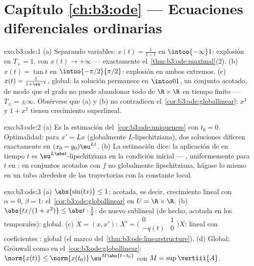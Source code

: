 \section*{Capítulo \ref{ch:b3:ode} --- Ecuaciones diferenciales
ordinarias}

\begin{solution}{exo:b3:ode:1}
(a) Separando variables: $x(t) = \frac1{1 - t}$ en $\intoo{-\infty}1$:
explosión en $T_+ = 1$, con $x(t) \to
+\infty$ --- exactamente el~\cref{thm:b3:ode:maximal}(2). (b)
$x(t) = \tan t$ en $\intoo{-\pi/2}{\pi/2}$: explosión en ambos extremos.
(c) $x(t) = \frac{1}{1 + \eu^{-t}}$, global: la solución permanece en
$\intoo01$, un conjunto acotado, de modo que el grafo no puede abandonar
todo  de $\R\times\R$ en
tiempo finito --- $T_\pm
= \pm\infty$. Obsérvese que (a) y (b) no contradicen
el~\cref{cor:b3:ode:globallinear}: $x^2$ y $1 + x^2$ tienen crecimiento
superlineal.
\end{solution}

\begin{solution}{exo:b3:ode:2}
(a) Es la estimación del~\cref{cor:b3:ode:uniqueness} con $t_0
= 0$. Optimalidad: para $x' = Lx$ (globalmente $L$-lipschitziana), dos
soluciones difieren exactamente en $(x_0 - y_0)\eu^{Lt}$. (b) La
estimación dice: la aplicación de
 en tiempo $t$ es
$\eu^{L\abs t}$-lipschitziana en la condición inicial ---
, uniformemente para $t$
en ; en conjuntos acotados
con $f$ no globalmente lipschitziana, hágase lo mismo en un tubo
 alrededor de las trayectorias
con la constante local.
\end{solution}

\begin{solution}{exo:b3:ode:3}
(a) $\abs{\sin(tx)} \leq 1$: acotada, es decir, crecimiento lineal con
$\alpha = 0$, $\beta = 1$: el~\cref{cor:b3:ode:globallinear} en
$U = \R\times\R$.
(b) $\abs{tx/(1 + x^2)} \leq \abs t\cdot\frac12$: de nuevo sublineal (de
hecho, acotada en los 
temporales): global. (c) $X = (x, x')$:
$X' = \bigl(\begin{smallmatrix}0 & 1\\ -q(t)
& 0\end{smallmatrix}\bigr)X$: lineal con coeficientes
: global (el marco
del~\cref{thm:b3:ode:linearstructure}). (d) Global; Grönwall como en
el~\cref{cor:b3:ode:globallinear}:
$\norm{x(t)} \leq \norm{x(t_0)}\,\eu^{M\abs{t - t_0}}$ con
$M = \sup\vertiii{A}$.
\end{solution}

